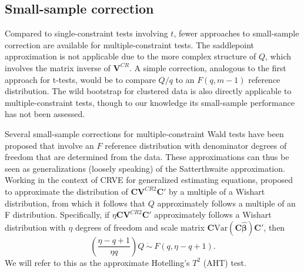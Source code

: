 \documentclass[12pt]{article}\usepackage[]{graphicx}\usepackage[]{color}
\newcommand{\Var}{\text{Var}}
\newcommand{\bm}{\mathbf}
\newcommand{\bs}{\boldsymbol}
\begin{document}
\subsection{Small-sample correction}

Compared to single-constraint tests involving $t$, fewer approaches to small-sample correction are available for multiple-constraint tests. 
The saddlepoint approximation is not applicable due to the more complex structure of $Q$, which involves the matrix inverse of $\bm{V}^{CR}$. 
A simple correction, analogous to the first approach for t-tests, would be to compare $Q / q$ to an $F(q, m - 1)$ reference distribution. 
The wild bootstrap for clustered data \citep{Webb2013wild} is also directly applicable to multiple-constraint tests, though to our knowledge its small-sample performance has not been assessed. 

Several small-sample corrections for multiple-constraint Wald tests have been proposed that involve an $F$ reference distribution with denominator degrees of freedom that are determined from the data. 
These approximations can thus be seen as generalizations (loosely speaking) of the Satterthwaite approximation. 
Working in the context of CRVE for generalized estimating equations, \cite{Pan2002small} proposed to approximate the distribution of $\bm{C}\bm{V}^{CR2} \bm{C}'$ by a multiple of a Wishart distribution, from which it follows that $Q$ approximately follows a multiple of an F distribution. 
Specifically, if $\eta \bm{C}\bm{V}^{CR2} \bm{C}'$ approximately follows a Wishart distribution with $\eta$ degrees of freedom and scale matrix $\bm{C} \Var\left(\bm{C}\bs{\hat\beta}\right)\bm{C}'$, then 
\begin{equation}
\label{eq:AHT}
\left(\frac{\eta - q + 1}{\eta q}\right) Q \ \dot\sim \ F(q, \eta - q + 1).
\end{equation}
We will refer to this as the approximate Hotelling's $T^2$ (AHT) test.
\end{document}
